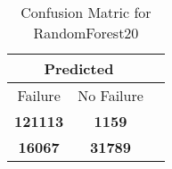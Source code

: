 \begin{table}[] 
\caption{Confusion Matric for RandomForest20} 
\label{Table: Prediction Accuracy-DMDRandomForest20OnlySunEKF-resetReflectionEKF-top2perfectNoFailurePrediction-Reflection} 
\centering 
\begin{tabular} 
 {@{}ccc@{}} 
\toprule 
\multicolumn{2}{c}{\textbf{Predicted}}
 \\ \midrule 
\multicolumn{1}{|c|}{Failure} & 
\multicolumn{1}{c|}{No Failure}
 \\ \midrule 
\multicolumn{1}{|c|}{\color{green}\textbf{121113}} & 
\multicolumn{1}{c|}{\color{red}\textbf{1159}}
 \\ \midrule 
\multicolumn{1}{|c|}{\color{red}\textbf{16067}} & 
\multicolumn{1}{c|}{\color{green}\textbf{31789}}
 \\ \bottomrule 
\end{tabular} 
\end{table} 

